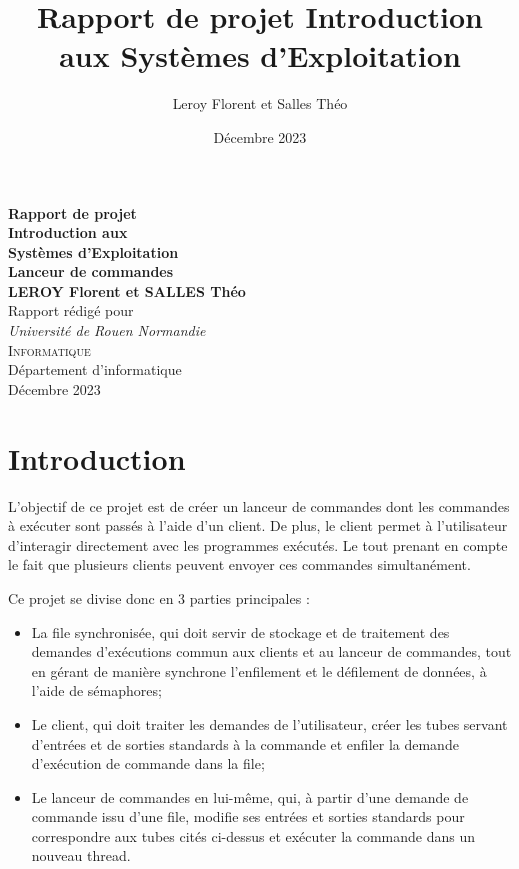 \documentclass[12pt]{article}
\title{Rapport de projet Introduction aux Systèmes d'Exploitation}
\author{Leroy Florent et Salles Théo}
\date{Décembre 2023}
\begin{document}
\begin{titlepage}
    \begin{center}
        {\large\bfseries Rapport de projet \\[1ex]}
        {\huge\bfseries Introduction aux \\[0.25ex] Systèmes d'Exploitation
            \\[2ex]}
        {\LARGE\bfseries Lanceur de commandes \\[6.5ex]}
        {\large\bfseries LEROY Florent et SALLES Théo \\}
        \vspace{4ex}
        Rapport rédigé pour\\[5pt]
        \textit{Université de Rouen Normandie}\\[2cm]
        \textsc{\large Informatique}\\[12ex]
        \vfill
        Département d'informatique\\
        \vfill
        Décembre 2023
    \end{center}
\end{titlepage}
\newpage
\tableofcontents
\newpage

\section{Introduction}
L'objectif de ce projet est de créer un lanceur de commandes dont les
commandes à exécuter sont passés à l'aide d'un client. De plus, le client
permet à l'utilisateur d'interagir directement avec les programmes exécutés. Le
tout prenant en compte le fait que plusieurs clients peuvent envoyer ces
commandes simultanément.

Ce projet se divise donc en 3 parties principales :
\begin{itemize}
    \item La file synchronisée, qui doit servir de stockage et de
          traitement des demandes d'exécutions commun aux clients et au lanceur de
          commandes, tout en gérant de manière synchrone l'enfilement et le défilement de
          données, à l'aide de sémaphores;
    \item Le client, qui doit traiter les demandes de l'utilisateur, créer
          les tubes servant d'entrées et de sorties standards à la commande et enfiler la
          demande d'exécution de commande dans la file;
    \item Le lanceur de commandes en lui-même, qui, à partir d'une demande
          de commande issu d'une file, modifie ses entrées et sorties standards pour
          correspondre aux tubes cités ci-dessus et exécuter la commande dans un nouveau
          thread.
\end{itemize}
\end{document}
